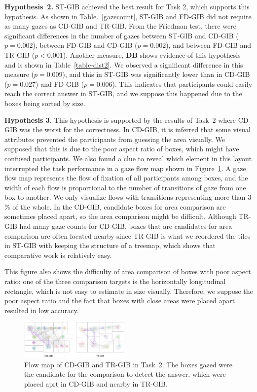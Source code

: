 \documentclass[review]{vgtc}                 %
\begin{document}
{\bf Hypothesis~2.} ST-GIB achieved the best result for Task 2, which supports this hypothesis. As shown in Table.~\ref{gazecount}, ST-GIB and FD-GIB did not require as many gazes as CD-GIB and TR-GIB. From the Friedman test, there were significant differences in the number of gazes between ST-GIB and CD-GIB ($p=0.002$), between FD-GIB and CD-GIB ($p=0.002$), and between FD-GIB and TR-GIB ($p<0.001$). Another measure, {\bf DB} shows evidence of this hypothesis and is shown in Table~\ref{table-dist2}. We observed a significant difference in this measure ($p=0.009$), and this in ST-GIB was significantly lower than in CD-GIB ($p=0.027$) and FD-GIB ($p=0.006$). This indicates that participants could easily reach the correct answer in ST-GIB, and we suppose this happened due to the boxes being sorted by size.

{\bf Hypothesis 3.} This hypothesis is supported by the results of Task~2 where CD-GIB was the worst for the correctness. In CD-GIB, it is inferred that some visual attributes prevented the participants from guessing the area visually.
We supposed that this is due to the poor aspect ratio of boxes, which might have confused participants. We also found a clue to reveal which element in this layout interrupted the task performance in a gaze flow map shown in Figure~\ref{task2flow}.
A gaze flow map represents the flow of fixation of all participants among boxes, and the width of each flow is proportional to the number of transitions of gaze from one box to another. We only visualize flows with transitions representing more than 3 \% of the whole. In the CD-GIB, candidate boxes for area comparison are sometimes placed apart, so the area comparison might be difficult.
Although TR-GIB had many gaze counts for CD-GIB, boxes that are candidates for area comparison are often located nearby since TR-GIB is what we reordered the tiles in ST-GIB with keeping the structure of a treemap, which shows that comparative work is relatively easy.

This figure also shows the difficulty of area comparison of boxes with poor aspect ratio: one of the three comparison targets is the horizontally longitudinal rectangle, which is not easy to estimate in size visually. Therefore, we suppose the poor aspect ratio and the fact that boxes with close areas were placed apart resulted in low accuracy.

\begin{figure}[t]
  \begin{center}
    \includegraphics[width=0.48\textwidth]{pictures/cd-tr-in2.png}
    \caption{Flow map of CD-GIB and TR-GIB in Task~2. The boxes gazed were the candidate for the comparison to detect the answer, which were placed aprt in CD-GIB and nearby in TR-GIB.}
    \label{task2flow}
  \end{center}
\end{figure}
\end{document}
